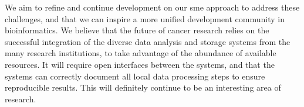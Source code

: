 We aim to refine and continue development on our \gls{sme} approach to address
these challenges, and that we can inspire a more unified development community
in bioinformatics. We believe that the future of cancer research relies on the
successful integration of the diverse data analysis and storage systems from the
many research institutions, to take advantage of the abundance of available
resources. It will require open interfaces between the systems, and that the
systems can correctly document all local data processing steps to ensure
reproducible results. This will definitely continue to be an interesting area of
research.


